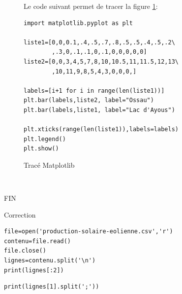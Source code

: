 \newpage

\begin{figure}[ht!]
\begin{minipage}{0.5\linewidth}
Le code suivant permet de tracer la figure \ref{fig:img6}:
\begin{verbatim}
import matplotlib.pyplot as plt

liste1=[0,0,0.1,.4,.5,.7,.8,.5,.5,.4,.5,.2\
		,.3,0,.1,.1,0,.1,0,0,0,0,0]
liste2=[0,0,3,4,5,7,8,10,10.5,11,11.5,12,13\
		,10,11,9,8,5,4,3,0,0,0,]

labels=[i+1 for i in range(len(liste1))]
plt.bar(labels,liste2, label="Ossau")
plt.bar(labels,liste1, label="Lac d'Ayous")

plt.xticks(range(len(liste1)),labels=labels)
plt.legend()
plt.show()
\end{verbatim}
\end{minipage}\hfill
\begin{minipage}{0.45\linewidth}
\centering\resizebox{0.9\textwidth}{!}{}
\caption{\label{fig:img6} Tracé Matplotlib}
\end{minipage}
\end{figure}

 ~\ \\

\begin{center}
\Large{FIN}
\end{center}




\begin{center}
\Large{Correction}
\end{center}

\reponse{}

\begin{verbatim}
file=open('production-solaire-eolienne.csv','r')
contenu=file.read()
file.close()
lignes=contenu.split('\n')
print(lignes[:2])
\end{verbatim}

\reponse{}

\begin{verbatim}
print(lignes[1].split(';'))
\end{verbatim}

